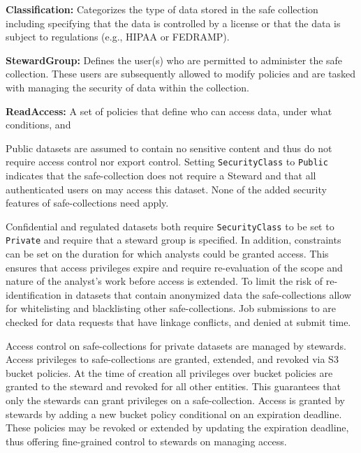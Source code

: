 \textbf{Classification:} Categorizes the type of data stored in the 
safe collection including specifying that the data is controlled by
a license or that the data is subject to regulations (e.g., HIPAA or FEDRAMP).

\textbf{StewardGroup:} Defines the user(s) who are permitted to 
administer the safe collection. These users are subsequently 
allowed to modify policies and are tasked with managing the 
security of data within the collection. 

\textbf{ReadAccess:} A set of policies that define who can
access data, under what conditions, and 




Public datasets are assumed to contain no sensitive content and thus do not require access control nor
export control. Setting \texttt{SecurityClass} to \texttt{Public} indicates that the safe-collection does
not require a Steward and that all authenticated users on \NAME may access this dataset. None of the added
security features of safe-collections need apply.

Confidential and regulated datasets both require \texttt{SecurityClass} to be set to \texttt{Private}
and require that a steward group is specified. In addition, constraints can be set on the duration
for which analysts could be granted access. This ensures that access privileges expire and require
re-evaluation of the scope and nature of the analyst's work before access is extended. To limit the risk of
re-identification in datasets that contain anonymized data the safe-collections allow for whitelisting and
blacklisting other safe-collections. Job submissions to \NAME are checked for data requests that have
linkage conflicts, and denied at submit time.

Access control on safe-collections for private datasets are managed by stewards. Access privileges to
safe-collections are granted, extended, and revoked via S3 bucket policies. At the time of creation all
privileges over bucket policies are granted to the steward and revoked for all other entities. This
guarantees that only the stewards can grant privileges on a safe-collection. Access is granted by stewards
by adding a new bucket policy conditional on an expiration deadline. These policies may be revoked or
extended by updating the expiration deadline, thus offering fine-grained control to stewards on managing
access.

